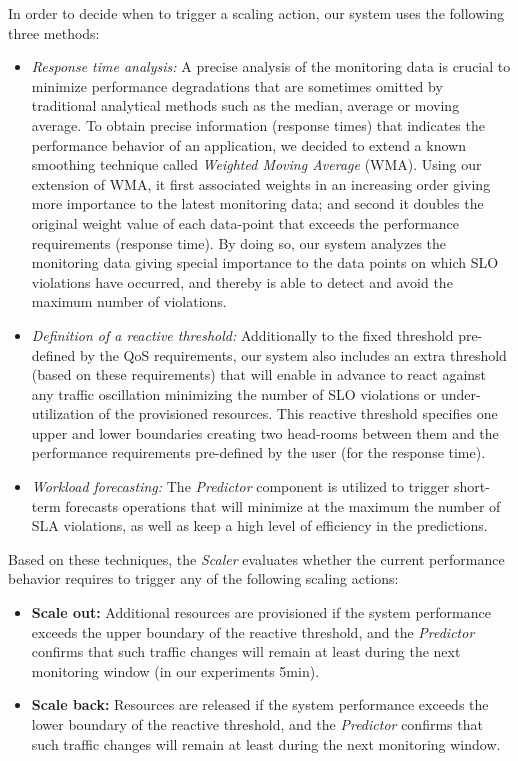 In order to decide when to trigger a scaling action, our system uses the following three methods: 
\begin{itemize}

\item \emph{Response time analysis:} A precise analysis of the monitoring data is crucial to minimize performance degradations that are sometimes omitted by traditional analytical methods such as the median, average or moving average. To obtain precise information (response times) that indicates the performance behavior of an application, we decided to extend a known smoothing technique called \emph{Weighted Moving Average} (WMA). Using our extension of WMA, it first associated weights in an increasing order giving more importance to the latest monitoring data; and second it doubles the original weight value of each data-point that exceeds the performance requirements (response time). By doing so, our system analyzes the monitoring data giving special importance to the data points on which SLO violations have occurred, and thereby is able to detect and avoid the maximum number of violations.

\item \emph{Definition of a reactive threshold:} Additionally to the fixed threshold pre-defined by the QoS requirements, our system also includes an extra threshold (based on these requirements) that will enable in advance to react against any traffic oscillation minimizing the number of SLO violations or under-utilization of the provisioned resources. This reactive threshold specifies one upper and lower boundaries creating two head-rooms between them and the performance requirements pre-defined by the user (for the response time).

\item \emph{Workload forecasting: }  The \emph{Predictor} component is utilized to trigger short-term forecasts operations that will minimize at the maximum the number of SLA violations, as well as keep a high level of efficiency in the predictions. 
\end{itemize}

Based on these techniques, the \emph{Scaler} evaluates whether the current performance behavior requires to trigger any of the following scaling actions:

\begin{itemize}

\item \textbf{Scale out:} Additional resources are provisioned if the system performance exceeds the upper boundary of the reactive threshold, and the \emph{Predictor} confirms that such traffic changes will remain at least during the next monitoring window (in our experiments 5min). 

\item \textbf{Scale back:} Resources are released if the system performance exceeds the lower boundary of the reactive threshold, and the \emph{Predictor} confirms that such traffic changes will remain at least during the next monitoring window.

\end{itemize}




